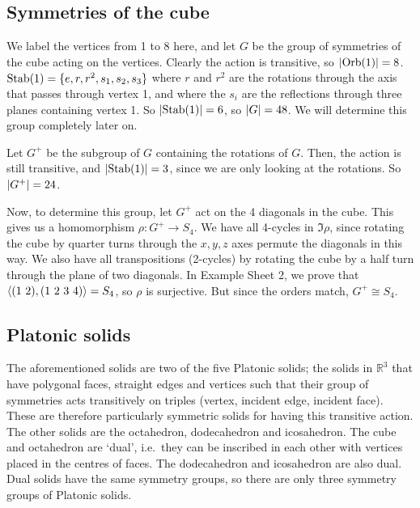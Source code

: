 \subsection{Symmetries of the cube}
We label the vertices from 1 to 8 here, and let \(G\) be the group of symmetries of the cube acting on the vertices.
Clearly the action is transitive, so \(\abs{\operatorname{Orb}(1)} = 8\).
\(\operatorname{Stab}(1) = \{ e, r, r^2, s_1, s_2, s_3 \}\) where \(r\) and \(r^2\) are the rotations through the axis that passes through vertex 1, and where the \(s_i\) are the reflections through three planes containing vertex 1.
So \(\abs{\operatorname{Stab}(1)} = 6\), so \(\abs{G} = 48\).
We will determine this group completely later on.

Let \(G^+\) be the subgroup of \(G\) containing the rotations of \(G\).
Then, the action is still transitive, and \(\abs{\operatorname{Stab}(1)} = 3\), since we are only looking at the rotations.
So \(\abs{G^+} = 24\).

Now, to determine this group, let \(G^+\) act on the 4 diagonals in the cube.
This gives us a homomorphism \(\rho\colon G^+ \to S_4\).
We have all 4-cycles in \(\Im \rho\), since rotating the cube by quarter turns through the \(x, y, z\) axes permute the diagonals in this way.
We also have all transpositions (2-cycles) by rotating the cube by a half turn through the plane of two diagonals.
In Example Sheet 2, we prove that \(\langle{} (1\ 2), (1\ 2\ 3\ 4) \rangle = S_4\), so \(\rho\) is surjective.
But since the orders match, \(G^+ \cong S_4\).

\subsection{Platonic solids}
The aforementioned solids are two of the five Platonic solids; the solids in \(\mathbb R^3\) that have polygonal faces, straight edges and vertices such that their group of symmetries acts transitively on triples (vertex, incident edge, incident face).
These are therefore particularly symmetric solids for having this transitive action.
The other solids are the octahedron, dodecahedron and icosahedron.
The cube and octahedron are `dual', i.e.\ they can be inscribed in each other with vertices placed in the centres of faces.
The dodecahedron and icosahedron are also dual.
Dual solids have the same symmetry groups, so there are only three symmetry groups of Platonic solids.

